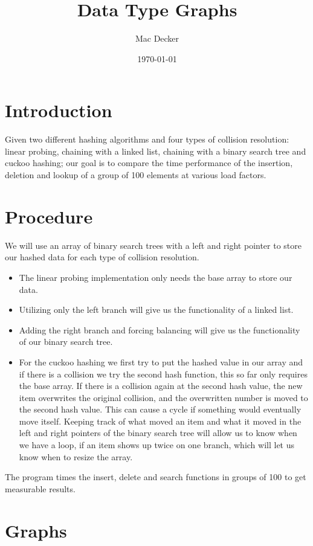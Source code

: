 \documentclass[11pt]{article}
\theoremstyle{definition}
\numberwithin{equation}{section}
\begin{document}
\title{Data Type Graphs}
\author{Mac Decker} 
\date{\today}

\maketitle

\section{Introduction}
Given two different hashing algorithms and four types of collision resolution: linear probing, chaining with a linked list, chaining with a binary search tree and cuckoo hashing; our goal is to compare the time performance of the insertion, deletion and lookup of a group of 100 elements at various load factors. 

\section{Procedure}
We will use an array of binary search trees with a left and right pointer to store our hashed data for each type of collision resolution. 
\begin{itemize}
	\item The linear probing implementation only needs the base array to store our data. 
	\item Utilizing only the left branch will give us the functionality of a linked list.
	\item Adding the right branch and forcing balancing will give us the functionality of our binary search tree. 
	\item For the cuckoo hashing we first try to put the hashed value in our array and if there is a collision we try the second hash function, this so far only requires the base array. If there is a collision again at the second hash value, the new item overwrites the original collision, and the overwritten number is moved to the second hash value. This can cause a cycle if something would eventually move itself. Keeping track of what moved an item and what it moved in the left and right pointers of the binary search tree will allow us to know when we have a loop, if an item shows up twice on one branch, which will let us know when to resize the array.
\end{itemize} 

The program times the insert, delete and search functions in groups of 100 to get measurable results.


\section{Graphs}
\end{document}
